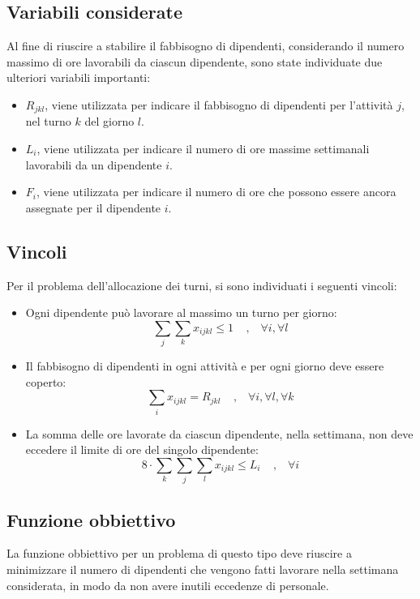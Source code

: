 \subsection{Variabili considerate}
Al fine di riuscire a stabilire il fabbisogno di dipendenti, considerando il numero massimo di ore lavorabili da ciascun dipendente, sono state individuate due ulteriori variabili importanti:
\begin{itemize}
	\item $R_{jkl}$, viene utilizzata per indicare il fabbisogno di dipendenti per l'attività $j$, nel turno $k$ del giorno $l$.
	\item $L_i$, viene utilizzata per indicare il numero di ore massime settimanali lavorabili da un dipendente $i$.
	\item $F_i$, viene utilizzata per indicare il numero di ore che possono essere ancora assegnate per il dipendente $i$.
\end{itemize}
\subsection{Vincoli}
Per il problema dell'allocazione dei turni, si sono individuati i seguenti vincoli:
\begin{itemize}
	\item Ogni dipendente può lavorare al massimo un turno per giorno:
		\begin{equation}
			\sum_{j} \sum_{k} x_{ijkl} \leq 1 \;\;\;\;,\;\;\;\forall i,\forall l
		\end{equation}
	\item Il fabbisogno di dipendenti in ogni attività e per ogni giorno deve essere coperto:
		\begin{equation}
			\sum_{i} x_{ijkl} = R_{jkl} \;\;\;\;,\;\;\;\forall i,\forall l, \forall k
		\end{equation}
	\item La somma delle ore lavorate da ciascun dipendente, nella settimana, non deve eccedere il limite di ore del singolo dipendente:
		\begin{equation}
			8 \cdot \sum_{k} \sum_{j} \sum_{l} x_{ijkl} \leq L_i \;\;\;\;,\;\;\;\forall i
		\end{equation}
\end{itemize}
\subsection{Funzione obbiettivo}
La funzione obbiettivo per un problema di questo tipo deve riuscire a minimizzare il numero di dipendenti che vengono fatti lavorare nella settimana considerata, in modo da non avere inutili eccedenze di personale.\\

